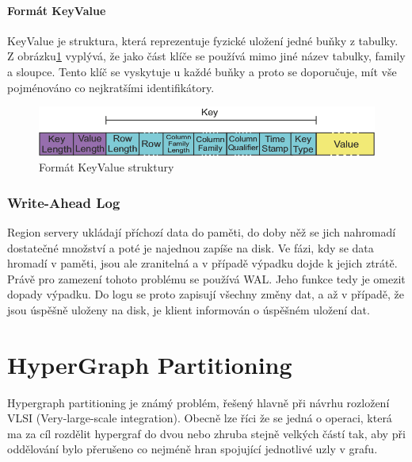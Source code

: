 \documentclass[thesis=M,czech]{FITthesis}[2012/06/26]
\begin{document}
\paragraph{Formát KeyValue}
KeyValue je struktura, která reprezentuje fyzické uložení jedné buňky z tabulky. Z obrázku\ref{fig:keyvalue} vyplývá, že jako část klíče se používá mimo jiné  název tabulky, family a sloupce. Tento klíč se vyskytuje u každé buňky a proto se doporučuje, mít vše pojménováno co nejkratšími identifikátory.	

\begin{figure}\centering
	\includegraphics[width=1\textwidth, angle=0]{files/key-value}
	\caption[Formát KeyValue struktury]{Formát KeyValue struktury}\label{fig:keyvalue}
\end{figure}

\subsubsection{Write-Ahead Log}
Region servery ukládají příchozí data do paměti, do doby něž se jich nahromadí dostatečné množství a poté je najednou zapíše na disk. Ve fázi, kdy se data hromadí v paměti, jsou ale zranitelná a v případě výpadku dojde k jejich ztrátě. Právě pro zamezení tohoto problému se používá WAL. Jeho funkce tedy je omezit dopady výpadku. Do logu se proto zapisují všechny změny dat, a až v případě, že jsou úspěšně uloženy na disk, je klient informován o úspěšném uložení dat. 

\section{HyperGraph Partitioning}
Hypergraph partitioning je známý problém, řešený hlavně při návrhu rozložení VLSI (Very-large-scale integration). Obecně lze říci že se jedná o operaci, která ma za cíl rozdělit hypergraf do dvou nebo zhruba stejně velkých částí tak, aby při oddělování bylo přerušeno co nejméně hran spojující jednotlivé uzly v grafu.
\end{document}
